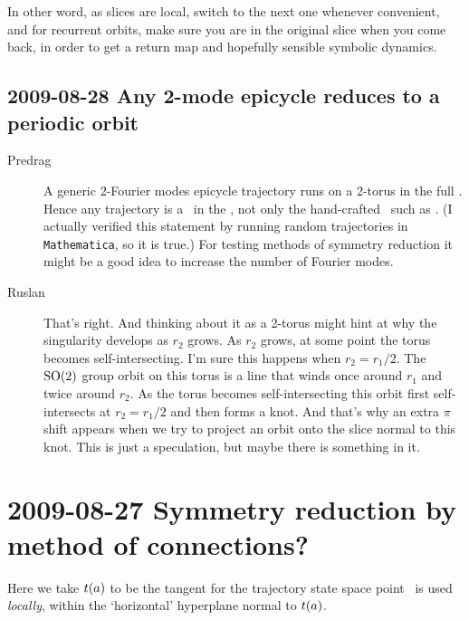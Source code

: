 In other word, as slices are local, switch to the next one whenever
convenient, and for recurrent orbits, make sure you are in the original
slice when you come back, in order to get a return map and hopefully sensible
symbolic dynamics.

\subsection{2009-08-28 Any 2-mode epicycle reduces to a periodic orbit}

\begin{description}
\item[Predrag]
A generic 2-Fourier modes epicycle trajectory runs on a 2-torus in the
full \statesp. Hence any trajectory is a \po\ in the \reducedsp, not
only the hand-crafted \rpo\ such as .
(I actually verified this statement by running random trajectories
in \texttt{Mathematica}, so it is true.)
For testing methods of symmetry reduction
it might be a good idea to increase the number of Fourier modes.
\item[Ruslan]
That's right.  And thinking about it
as a 2-torus might hint at why the singularity develops as
$r_2$ grows. As $r_2$ grows, at some point the torus becomes
self-intersecting. I'm sure this happens when $r_2 = r_1/2$.
The $\textrm{SO}(2)$ group orbit on this torus is a line that winds once
around $r_1$ and twice around $r_2$.  As the torus becomes
self-intersecting this orbit first self-intersects at $r_2 =
r_1/2$ and then forms a knot.  And that's why an extra $\pi$
shift appears when we try to project an orbit onto the slice
normal to this knot.  This is just a speculation, but maybe
there is something in it.
\end{description}

\section{2009-08-27 Symmetry reduction by method of connections?}

Here we take $t(a)$ to
be the tangent for the trajectory state space point \ssp\ is
used \emph{locally}, within the `horizontal' hyperplane
normal to $t(a)$.

